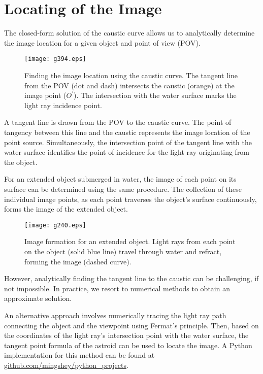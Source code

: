\documentclass[twocolumn]{article}
\begin{document}
\section{Locating of the Image}

The closed-form solution of the caustic curve allows us to analytically determine the image location for a given object and point of view (POV).

\begin{figure}[htbp]
	\centering
	\texttt{[image: g394.eps]}
	\caption{Finding the image location using the caustic curve. The tangent line from the POV (dot and dash) intersects the caustic (orange) at the image point ($O^\prime$). The intersection with the water surface marks the light ray incidence point. }
	\label{fig:image_location}
\end{figure}

A tangent line is drawn from the POV to the caustic curve. The point of tangency between this line and the caustic represents the image location of the point source. Simultaneously, the intersection point of the tangent line with the water surface identifies the point of incidence for the light ray originating from the object.

For an extended object submerged in water, the image of each point on its surface can be determined using the same procedure. The collection of these individual image points, as each point traverses the object's surface continuously, forms the image of the extended object.

\begin{figure}[htbp]
	\centering
	\texttt{[image: g240.eps]}
	\caption{Image formation for an extended object. Light rays from each point on the object (solid blue line) travel through water and refract, forming the image (dashed curve).}
	\label{fig:extended_object}
\end{figure}

However, analytically finding the tangent line to the caustic can be challenging, if not impossible. In practice, we resort to numerical methods to obtain an approximate solution.

An alternative approach involves numerically tracing the light ray path connecting the object and the viewpoint using Fermat's principle. Then, based on the coordinates of the light ray's intersection point with the water surface, the tangent point formula of the astroid can be used to locate the image. A Python implementation for this method can be found at \href{https://github.com/mingshey/python_projects/blob/main/Refraction_Image_en.ipynb}{github.com/mingshey/python\_projects}.
\end{document}
